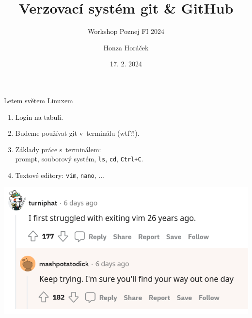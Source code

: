 \documentclass[
]{beamer}
\title{Verzovací systém git \& GitHub}
\subtitle{Workshop Poznej FI 2024}
\author[Honza Horáček]{Honza Horáček}
\institute[FI MU]{Spolek přátel severské zvěře, Fakulta informatiky, Masarykova univerzita}
\date{17. 2. 2024}
\begin{document}
\begin{frame}[plain]
\maketitle
\end{frame}

\begin{frame}{Letem světem Linuxem}
\begin{enumerate}
	\item Login na tabuli.
	\item Budeme používat git v terminálu (wtf?!).
	\item Základy práce s terminálem: \\
	prompt, souborový systém, \texttt{ls}, \texttt{cd}, \texttt{Ctrl+C}.
	\pause
	\item Textové editory: \texttt{vim}, \texttt{nano}, ...
\end{enumerate}
\end{frame}

\begin{frame}
\includegraphics[width=\textwidth]{images/vim1.png}
\end{frame}
\end{document}
